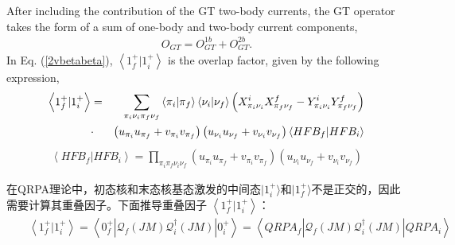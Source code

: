 \documentclass[master]{shnuthesis}
\begin{document}
After including the contribution of the GT two-body currents, the GT operator takes the form of a sum of one-body and two-body current components,
\begin{eqnarray}
    O_{GT} = O_{GT}^{1b} + O_{GT}^{2b}.
\end{eqnarray}
In Eq. (\ref{2vbetabeta}), $\left\langle 1_f^+|1_i^+ \right\rangle$ is the overlap factor, given by the following expression,
\begin{eqnarray}
    \left\langle 1_f^+|1_i^+ \right\rangle &=& \sum_{\pi_i\nu_i\pi_f\nu_f} \left\langle \pi_i | \pi_f \right\rangle \left\langle \nu_i | \nu_f \right\rangle \left(X_{\pi_i\nu_i}^{i}X_{\pi_f\nu_f}^{f} - Y_{\pi_i\nu_i}^{i}Y_{\pi_f\nu_f}^{f}\right) \notag\\
    &\cdot& \left( u_{\pi_i}u_{\pi_f}+v_{\pi_i}v_{\pi_f} \right) \left( u_{\nu_i}u_{\nu_f}+v_{\nu_i}v_{\nu_f} \right) \left\langle HFB_f|HFB_i \right\rangle
\end{eqnarray}
\begin{eqnarray}
    \left\langle HFB_f|HFB_i \right\rangle = \prod_{\pi_i\pi_f\nu_i\nu_f} \left( u_{\pi_i}u_{\pi_f}+v_{\pi_i}v_{\pi_f} \right) \left( u_{\nu_i}u_{\nu_f}+v_{\nu_i}v_{\nu_f} \right)
\end{eqnarray}

在QRPA理论中，初态核和末态核基态激发的中间态$|1_i^+ \rangle$和$|1_f^+ \rangle$不是正交的，因此需要计算其重叠因子。下面推导重叠因子 $\left\langle 1_f^+|1_i^+ \right\rangle$：
\begin{align}
    &&\left\langle 1_f^+|1_i^+ \right\rangle = \left\langle 0_f^+\left|\mathcal{Q}_f(JM) \mathcal{Q}_i^\dagger(JM)\right|0_i^+ \right\rangle = \left\langle QRPA_f\left|\mathcal{Q}_f(JM) \mathcal{Q}_i^\dagger(JM)\right|QRPA_i \right\rangle \label{1f1i_1}
\end{align}
\end{document}
